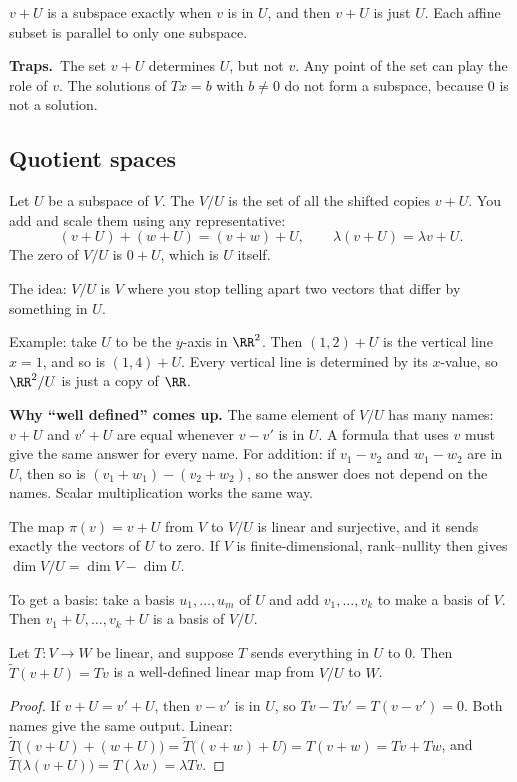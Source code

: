 \documentclass[11pt]{scrartcl}
\newcommand{\traps}{\par\medskip\noindent\textbf{\color{RawSienna}Traps.}\ }
\begin{document}
\begin{proposition*}[HW4 P6, Prop.~38]
  $v+U$ is a subspace exactly when $v$ is in $U$, and then $v+U$ is just $U$.
  Each affine subset is parallel to only one subspace.
\end{proposition*}

\traps The set $v+U$ determines $U$, but not $v$. Any point of the set can play the role of $v$.
The solutions of $Tx=b$ with $b\ne0$ do not form a subspace, because $0$ is not a solution.

\subsection{Quotient spaces}
\begin{definition*}
  Let $U$ be a subspace of $V$. The  $V/U$ is the set of all the shifted copies $v+U$.
  You add and scale them using any representative:
  \[ (v+U)+(w+U)=(v+w)+U,\qquad \lambda(v+U)=\lambda v+U. \]
  The zero of $V/U$ is $0+U$, which is $U$ itself.
\end{definition*}
The idea: $V/U$ is $V$ where you stop telling apart two vectors that differ by something in $U$.

Example: take $U$ to be the $y$-axis in $\RR^2$. Then $(1,2)+U$ is the vertical line $x=1$, and so is $(1,4)+U$. Every vertical line is determined by its $x$-value, so $\RR^2/U$ is just a copy of $\RR$.

\textbf{Why ``well defined'' comes up.}
The same element of $V/U$ has many names: $v+U$ and $v'+U$ are equal whenever $v-v'$ is in $U$.
A formula that uses $v$ must give the same answer for every name.
For addition: if $v_1-v_2$ and $w_1-w_2$ are in $U$, then so is $(v_1+w_1)-(v_2+w_2)$, so the answer does not depend on the names. Scalar multiplication works the same way.

\begin{proposition*}[LADR 3.104, 3.105]
  The map $\pi(v)=v+U$ from $V$ to $V/U$ is linear and surjective, and it sends exactly the vectors of $U$ to zero.
  If $V$ is finite-dimensional, rank--nullity then gives $\dim V/U=\dim V-\dim U$.

  To get a basis: take a basis $u_1,\dots,u_m$ of $U$ and add $v_1,\dots,v_k$ to make a basis of $V$. Then $v_1+U,\dots,v_k+U$ is a basis of $V/U$.
\end{proposition*}

\begin{proposition*}
  Let $T\colon V\to W$ be linear, and suppose $T$ sends everything in $U$ to $0$.
  Then $\tilde T(v+U)=Tv$ is a well-defined linear map from $V/U$ to $W$.
\end{proposition*}
\begin{proof}
  If $v+U=v'+U$, then $v-v'$ is in $U$, so $Tv-Tv'=T(v-v')=0$. Both names give the same output.
  Linear: $\tilde T\big((v+U)+(w+U)\big)=\tilde T\big((v+w)+U\big)=T(v+w)=Tv+Tw$, and $\tilde T\big(\lambda(v+U)\big)=T(\lambda v)=\lambda Tv$.
\end{proof}
\end{document}
